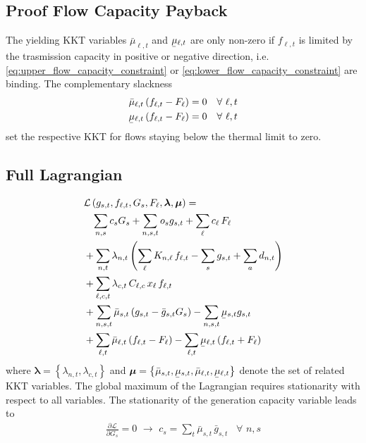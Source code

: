 \documentclass[11pt,twocolumn]{article}
\newcommand{\ubar}[1]{\underaccent{\bar}{#1}}
\newcommand{\Forall}[1]{\hspace{10pt} \forall \,\, #1 }
\newcommand{\pdv}[2]{\frac{\partial #1}{\partial #2}}
\newcommand{\generation}{g_{s,t}}
\newcommand{\generationpotential}{\bar{g}_{s,t}}
\newcommand{\capacityGeneration}{G_{s}}
\newcommand{\capacityFlow}{F_{\ell}}
\newcommand{\capexGeneration}{c_{s}}
\newcommand{\capexFlow}{c_{\ell}}
\newcommand{\opexGeneration}{o_{s}}
\newcommand{\demand}[1][n]{d_{#1,t}}
\newcommand{\incidence}[1][n]{K_{#1,\ell}}
\newcommand{\mulowergeneration}{\ubar{\mu}_{s,t}}
\newcommand{\muuppergeneration}{\bar{\mu}_{s,t}}
\newcommand{\mulowerflow}{\ubar{\mu}_{\ell,t}}
\newcommand{\muupperflow}{\bar{\mu}_{\ell,t}}
\newcommand{\lmp}[1][n]{\lambda_{#1,t}}
\newcommand{\flow}{f_{\ell,t}}
\newcommand{\cycle}{C_{\ell,c}}
\newcommand{\impedance}{x_\ell}
\newcommand{\cycleprice}{\lambda_{c,t}}
\newcommand{\lagrangian}{\mathcal{L}}
\begin{document}
\subsection{Proof Flow Capacity Payback}

The yielding KKT variables $\muupperflow$ and $\mulowerflow$ are only non-zero if $\flow$ is limited by the trasmission capacity in positive or negative direction, i.e. \cref{eq:upper_flow_capacity_constraint} or \cref{eq:lower_flow_capacity_constraint} are binding. The complementary slackness 
\begin{align}
\muupperflow \left( \flow - \capacityFlow \right)  &= 0 \Forall{\ell,t}
\label{eq:complementary_slackness_upper_flow} \\
\mulowerflow \left( \flow - \capacityFlow \right) &=  0 \Forall{\ell,t}
\label{eq:complementary_slackness_lower_flow} 
\end{align}
set the respective KKT for flows staying below the thermal limit to zero. 





\subsection{Full Lagrangian}
\label{sec:full_lagrangian}
\begin{align}
\notag
& \lagrangian\left(\generation, \flow, \capacityGeneration, \capacityFlow, \boldsymbol{\lambda}, \boldsymbol{\mu} \right)   =   \\  
\notag
& \;\;\; \sum_{n,s} \capexGeneration \capacityGeneration + \sum_{n, s, t} \opexGeneration \generation + \sum_{\ell} \capexFlow \, \capacityFlow  \\
\notag
&+ \sum_{n,t} \lmp \left(\sum_\ell \incidence \, \flow  - \sum_s \generation + \sum_a \demand  \right)  \\ 
\notag
&+ \sum_{\ell,c,t} \cycleprice \, \cycle \, \impedance \, \flow  \\
\notag
&+ \sum_{n,s,t} \muuppergeneration \left( \generation - \generationpotential \capacityGeneration \right)  - \sum_{n,s,t} \mulowergeneration \generation  \\
&+ \sum_{\ell,t} \muupperflow \left( \flow - \capacityFlow \right) - \sum_{\ell,t} \mulowerflow \left( \flow + \capacityFlow \right)     
\label{eq:full_lagrangian}
\end{align}
% 
where $\boldsymbol{\lambda} = \left\lbrace \lmp, \cycleprice \right\rbrace $ and $\boldsymbol{\mu} = \left\lbrace \muuppergeneration, \mulowergeneration, \muupperflow, \mulowerflow \right\rbrace $ denote the set of related KKT variables. The global maximum of the Lagrangian requires stationarity with respect to all variables. The stationarity of the generation capacity variable leads to 
\begin{align}
\pdv{\lagrangian}{\capacityGeneration}  = 0 \,\, \rightarrow \,\, 
\capexGeneration =  \sum_t \muuppergeneration \, \generationpotential  \Forall{n,s}
\label{eq:capexGeneration_duality}
\end{align}
\end{document}
